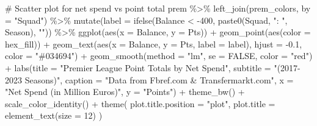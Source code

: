 \documentclass[
  letterpaper,
  DIV=11,
  numbers=noendperiod]{scrartcl}
\newenvironment{Shaded}{\begin{snugshade}}{\end{snugshade}}
\newcommand{\AttributeTok}[1]{\textcolor[rgb]{0.40,0.45,0.13}{#1}}
\newcommand{\CommentTok}[1]{\textcolor[rgb]{0.37,0.37,0.37}{#1}}
\newcommand{\ConstantTok}[1]{\textcolor[rgb]{0.56,0.35,0.01}{#1}}
\newcommand{\DecValTok}[1]{\textcolor[rgb]{0.68,0.00,0.00}{#1}}
\newcommand{\FloatTok}[1]{\textcolor[rgb]{0.68,0.00,0.00}{#1}}
\newcommand{\FunctionTok}[1]{\textcolor[rgb]{0.28,0.35,0.67}{#1}}
\newcommand{\NormalTok}[1]{\textcolor[rgb]{0.00,0.23,0.31}{#1}}
\newcommand{\SpecialCharTok}[1]{\textcolor[rgb]{0.37,0.37,0.37}{#1}}
\newcommand{\StringTok}[1]{\textcolor[rgb]{0.13,0.47,0.30}{#1}}
\begin{document}
\begin{Shaded}
\begin{Highlighting}[]
\CommentTok{\# Scatter plot for net spend vs point total}
\NormalTok{prem }\SpecialCharTok{\%\textgreater{}\%}
  \FunctionTok{left\_join}\NormalTok{(prem\_colors, }\AttributeTok{by =} \StringTok{"Squad"}\NormalTok{) }\SpecialCharTok{\%\textgreater{}\%}
  \FunctionTok{mutate}\NormalTok{(}\AttributeTok{label =} \FunctionTok{ifelse}\NormalTok{(Balance }\SpecialCharTok{\textless{}} \SpecialCharTok{{-}}\DecValTok{400}\NormalTok{, }\FunctionTok{paste0}\NormalTok{(Squad, }\StringTok{": "}\NormalTok{, Season), }\StringTok{""}\NormalTok{)) }\SpecialCharTok{\%\textgreater{}\%}
  \FunctionTok{ggplot}\NormalTok{(}\FunctionTok{aes}\NormalTok{(}\AttributeTok{x =}\NormalTok{ Balance, }\AttributeTok{y =}\NormalTok{ Pts)) }\SpecialCharTok{+}
    \FunctionTok{geom\_point}\NormalTok{(}\FunctionTok{aes}\NormalTok{(}\AttributeTok{color =}\NormalTok{ hex\_fill)) }\SpecialCharTok{+}
    \FunctionTok{geom\_text}\NormalTok{(}\FunctionTok{aes}\NormalTok{(}\AttributeTok{x =}\NormalTok{ Balance, }\AttributeTok{y =}\NormalTok{ Pts, }\AttributeTok{label =}\NormalTok{ label), }\AttributeTok{hjust =} \SpecialCharTok{{-}}\FloatTok{0.1}\NormalTok{, }\AttributeTok{color =} \StringTok{"\#034694"}\NormalTok{) }\SpecialCharTok{+}
    \FunctionTok{geom\_smooth}\NormalTok{(}\AttributeTok{method =} \StringTok{"lm"}\NormalTok{, }\AttributeTok{se =} \ConstantTok{FALSE}\NormalTok{, }\AttributeTok{color =} \StringTok{"red"}\NormalTok{) }\SpecialCharTok{+}
    \FunctionTok{labs}\NormalTok{(}\AttributeTok{title =} \StringTok{"Premier League Point Totals by Net Spend"}\NormalTok{,}
         \AttributeTok{subtitle =} \StringTok{"(2017{-}2023 Seasons)"}\NormalTok{,}
         \AttributeTok{caption =} \StringTok{"Data from Fbref.com \& Transfermarkt.com"}\NormalTok{,}
         \AttributeTok{x =} \StringTok{"Net Spend (in Million Euros)"}\NormalTok{,}
         \AttributeTok{y =} \StringTok{"Points"}\NormalTok{) }\SpecialCharTok{+}
  \FunctionTok{theme\_bw}\NormalTok{() }\SpecialCharTok{+}
  \FunctionTok{scale\_color\_identity}\NormalTok{() }\SpecialCharTok{+}
  \FunctionTok{theme}\NormalTok{(}
    \AttributeTok{plot.title.position =} \StringTok{"plot"}\NormalTok{,}
    \AttributeTok{plot.title =} \FunctionTok{element\_text}\NormalTok{(}\AttributeTok{size =} \DecValTok{12}\NormalTok{)}
\NormalTok{  )}
\end{Highlighting}
\end{Shaded}
\end{document}
